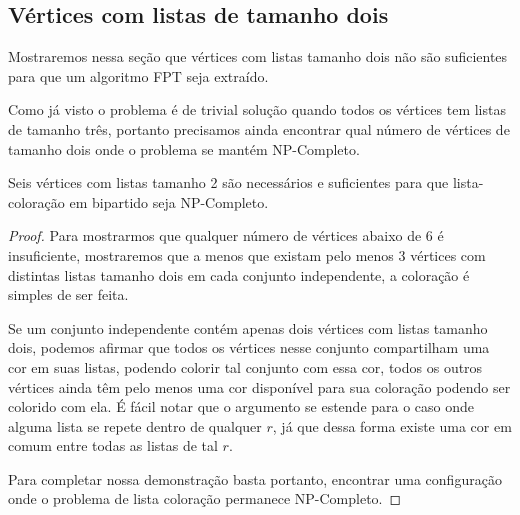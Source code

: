 \subsection{Vértices com listas de tamanho dois}
Mostraremos nessa seção que vértices com listas tamanho dois não são suficientes para que um algoritmo FPT seja extraído.

Como já visto o problema é de trivial solução quando todos os vértices tem listas de tamanho três, portanto precisamos ainda encontrar qual número de vértices de tamanho dois onde o problema se mantém NP-Completo.

\begin{teorema}
 Seis vértices com listas tamanho 2 são necessários e suficientes para que lista-coloração em bipartido seja NP-Completo.
\end{teorema}
\begin{proof}
 Para mostrarmos que qualquer número de vértices abaixo de 6 é insuficiente, mostraremos que a menos que existam pelo menos 3 vértices com distintas listas tamanho dois em cada conjunto independente, a coloração é simples de ser feita. 
 
 Se um conjunto independente contém apenas dois vértices com listas tamanho dois, podemos afirmar que todos os vértices nesse conjunto compartilham uma cor em suas listas, podendo colorir tal conjunto com essa cor, todos os outros vértices ainda têm pelo menos uma cor disponível para sua coloração podendo ser colorido com ela. É fácil notar que o argumento se estende para o caso onde alguma lista se repete dentro de qualquer $r$, já que dessa forma existe uma cor em comum entre todas as listas de tal $r$.
 
 Para completar nossa demonstração basta portanto, encontrar uma configuração onde o problema de lista coloração permanece NP-Completo.
 

\end{proof}
